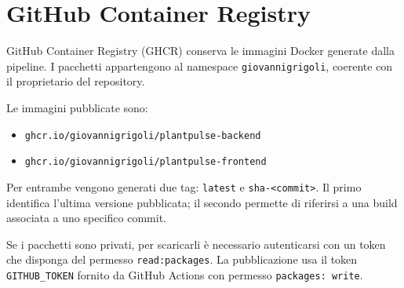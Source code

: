 \chapter{GitHub Container Registry}

GitHub Container Registry (GHCR) conserva le immagini Docker generate dalla pipeline. I pacchetti appartengono al namespace \texttt{giovannigrigoli}, coerente con il proprietario del repository.

Le immagini pubblicate sono:
\begin{itemize}
    \item \texttt{ghcr.io/giovannigrigoli/plantpulse-backend}
    \item \texttt{ghcr.io/giovannigrigoli/plantpulse-frontend}
\end{itemize}

Per entrambe vengono generati due tag: \texttt{latest} e \texttt{sha-<commit>}. Il primo identifica l'ultima versione pubblicata; il secondo permette di riferirsi a una build associata a uno specifico commit.

Se i pacchetti sono privati, per scaricarli è necessario autenticarsi con un token che disponga del permesso \texttt{read:packages}. La pubblicazione usa il token \texttt{GITHUB\_TOKEN} fornito da GitHub Actions con permesso \texttt{packages: write}.
